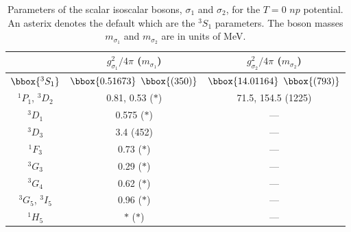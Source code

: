 \vspace*{5cm}


\begin{table}
\caption{Parameters of the scalar isoscalar bosons, $\sigma_1$
and $\sigma_2$, for the $T=0$ $np$ potential. An asterix denotes
the default which are the $^3S_1$ parameters.
The boson masses $m_{\sigma_1}$ and $m_{\sigma_2}$ are in units of MeV.}
\begin{tabular}{ccc}
              
 & $g^2_{\sigma_1}/4\pi$
  ($m_{\sigma_1}$)
 & $g^2_{\sigma_2}/4\pi$
  ($m_{\sigma_2}$)
\\
\hline 
$\bbox{^3S_1}$ & $\bbox{0.51673}$ $\bbox{(350)}$ & $\bbox{14.01164}$ $\bbox{(793)}$  \\
$^1P_1$, $^3D_2$ & 0.81, 0.53 ($\ast$) & 71.5, 154.5 (1225) \\
$^3D_1$ & 0.575 ($\ast$) & --- \\
$^3D_3$ & 3.4 (452) & --- \\
$^1F_3$ & 0.73 ($\ast$) & --- \\
$^3G_3$ & 0.29 ($\ast$) & --- \\
$^3G_4$ & 0.62 ($\ast$) & --- \\
$^3G_5$, $^3I_5$ & 0.96 ($\ast$) & --- \\
$^1H_5$ & $\ast$ ($\ast$) & --- \\
\end{tabular}
\label{tab_par2}
\end{table}


\pagebreak


